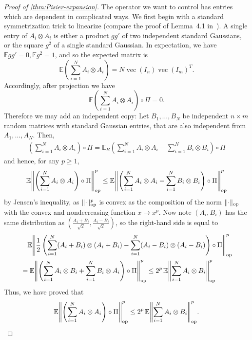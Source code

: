 \documentclass[aos]{imsart}
\theoremstyle{definition}
\numberwithin{equation}{section}
\DeclareMathOperator{\op}{op}
\DeclareMathOperator{\vect}{vec}
\DeclarePairedDelimiter{\norm}{\lVert}{\rVert}
\newcommand{\E}{\mathbb{E}}
\begin{document}
\begin{appendix}
\begin{proof} [Proof of \cref{thm:Pisier-expansion}]
The operator we want to control has entries which are dependent in complicated ways.
We first begin with a standard symmetrization trick to linearize (compare the proof of Lemma~4.1 in~\cite{P14}).
A single entry of $A_i \otimes A_i$ is either a product $g g'$ of two independent standard Gaussians, or the square $g^2$ of a single standard Gaussian.
In expectation, we have $\E g g' = 0, \E g^{2} = 1$, and so the expected matrix is
\[ \E \left( \sum_{i=1}^N A_i \otimes A_i \right) = N \vect(I_n) \vect(I_m)^T. \]
Accordingly, after projection we have
\[ \E \left( \sum_{i=1}^N A_i \otimes A_i \right) \circ \Pi = 0. \]
Therefore we may add an independent copy:
Let $B_1,\dots,B_N$ be independent $n\times m$ random matrices with standard Gaussian entries, that are also independent from~$A_1,\dots,A_N$.
Then,
\begin{align*}
  \left( \sum_{i=1}^N A_i \otimes A_i \right) \circ \Pi
= \E_B \left( \sum_{i=1}^N A_i \otimes A_i - \sum_{i=1}^N B_i \otimes B_i \right) \circ \Pi
\end{align*}
and hence, for any $p\geq1$,
\begin{align*}
  \E \norm*{\left( \sum_{i=1}^N A_i \otimes A_i \right) \circ \Pi}_{\op}^p
\leq \E \norm*{\left( \sum_{i=1}^N A_i \otimes A_i - \sum_{i=1}^N B_i \otimes B_i \right) \circ \Pi}_{\op}^p
\end{align*}
by Jensen's inequality, as $\norm{\cdot}_{\op}^p$ is convex as the composition of the norm $\norm{\cdot}_{\op}$ with the convex and nondecreasing function $x \to x^{p}$.
Now note $(A_i,B_i)$ has the same distribution as $(\frac{A_i+B_i}{\sqrt2},\frac{A_i-B_i}{\sqrt2})$, so the right-hand side is equal to
\begin{align*}
&\quad \E \norm*{ \frac{1}{2} \left( \sum_{i=1}^N (A_i + B_i) \otimes (A_i + B_i) - \sum_{i=1}^N (A_i - B_i) \otimes(A_i - B_i) \right) \circ \Pi}_{\op}^p \\
&= \E \norm*{\left( \sum_{i=1}^N A_i \otimes B_i + \sum_{i=1}^N B_i \otimes A_i \right) \circ \Pi}_{\op}^p
\leq 2^{p} \, \E \norm*{\sum_{i=1}^N A_i \otimes B_i}_{\op}^p
\end{align*}
Thus, we have proved that
\begin{align}\label{eq:symmetrization}
  \E \norm*{\left( \sum_{i=1}^N A_i \otimes A_i \right) \circ \Pi}_{\op}^p
\leq 2^{p} \, \E \norm*{\sum_{i=1}^N A_i \otimes B_i}_{\op}^p.
\end{align}

\end{proof}
\end{appendix}
\end{document}
